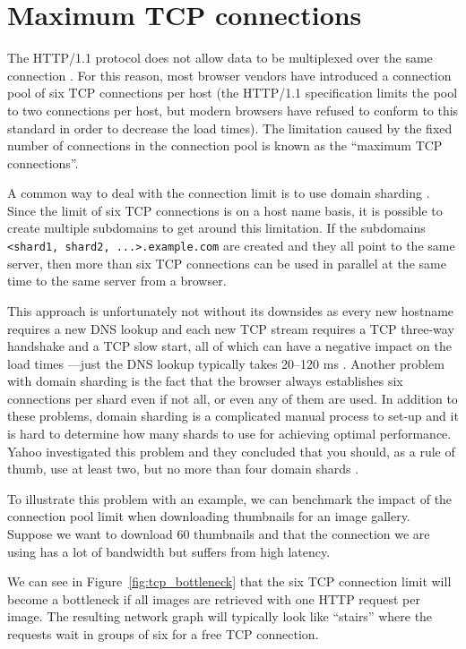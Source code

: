 \documentclass{cslthse-msc}
\begin{document}
\section{Maximum TCP connections}
\label{max_tcp}
The HTTP/1.1 protocol does not allow data to be multiplexed over the same connection \cite[p.194]{HPBN}. For this reason, most browser vendors have introduced a connection pool of six TCP connections per host (the HTTP/1.1 specification limits the pool to two connections \cite{rfc2616} per host, but modern browsers have refused to conform to this standard in order to decrease the load times). The limitation caused by the fixed number of connections in the connection pool is known as the \enquote{maximum TCP connections}.

A common way to deal with the connection limit is to use domain sharding \cite[page 161]{sharding}	. Since the limit of six TCP connections is on a host name basis, it is possible to create multiple subdomains to get around this limitation. If the subdomains \lstinline{<shard1, shard2, ...>.example.com} are created and they all point to the same server, then more than six TCP connections can be used in parallel at the same time to the same server from a browser.

This approach is unfortunately not without its downsides as every new hostname requires a new DNS lookup and each new TCP stream requires a TCP three-way handshake and a TCP slow start, all of which can have a negative impact on the load times \cite[page 199]{HPBN}---just the DNS lookup typically takes 20--120 ms \cite[page 63]{HPWS}. Another problem with domain sharding is the fact that the browser always establishes six connections per shard even if not all, or even any of them are used. In addition to these problems, domain sharding is a complicated manual process to set-up and it is hard to determine how many shards to use for achieving optimal performance. Yahoo investigated this problem and they concluded that you should, as a rule of thumb, use at least two, but no more than four domain shards \cite{yahoo-performance-4}.

To illustrate this problem with an example, we can benchmark the impact of the connection pool limit when downloading thumbnails for an image gallery. Suppose we want to download 60 thumbnails and that the connection we are using has a lot of bandwidth but suffers from high latency.

We can see in Figure~\ref{fig:tcp_bottleneck} that the six TCP connection limit will become a bottleneck if all images are retrieved with one HTTP request per image. The resulting network graph will typically look like \enquote{stairs} where the requests wait in groups of six for a free TCP connection.
\end{document}
